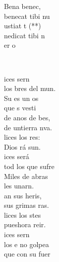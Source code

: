 \documentclass[12pt]{article}
\begin{document}
\begin{multicols*}{2}
\begin{cancion}[Benedicat][]
\begin{chorus}
	Bena     benec,\\
	benecat tibi nu\\
	ustiat t (**)\\
	nedicat tibi n\\
	er o \\
	\end{chorus}%
	\jump\\
\end{cancion}%

\begin{cancion}%
	ices sern\\
	los bres del mun.\\
	Su  es un os\\
	que s vesti \\
	de anos de bes,\\
	de untierra nva.\\
	lices los res:\\
	Dios rá sun.\\
	ices será\\
	tod los que sufre\\
	Miles de abras\\
	les unarn.\\
	an sus heris,\\
	sus grimas ras. \\
	lices los stes\\
	pueshora reir.\\
	ices sern\\
	los e no golpea\\
	 que con su fuer\\

\end{cancion}
\end{multicols*}
\end{document}
